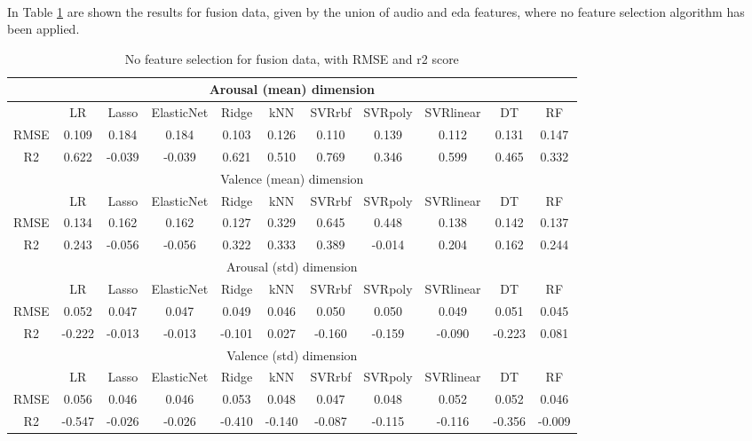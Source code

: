 \\
In Table \ref{table:fusion_no_fs} are shown the results for fusion data, given by the union of audio and \gls{eda} features, where no feature selection algorithm has been applied.
\begin{table}[h!]
\begin{adjustwidth}{-3cm}{-1cm}
	\centering
	\begin{tabular}{|c|c|c|c|c|c|c|c|c|c|c|}
		\hline \multicolumn{11}{|c|}{Arousal (mean) dimension} \\
		\hline & LR & Lasso & ElasticNet & Ridge & kNN & SVRrbf & SVRpoly & SVRlinear & DT & RF \\
		\hline RMSE & 0.109 & 0.184 & 0.184 & \cellcolor{yellow}0.103 & 0.126 & 0.110 & 0.139 & 0.112 & 0.131 & 0.147 \\
		\hline R2 & 0.622 & -0.039 & -0.039 & 0.621 & 0.510 & \cellcolor{yellow}0.769 & 0.346 & 0.599 & 0.465 & 0.332 \\
		\hline \hline  \multicolumn{11}{|c|}{Valence (mean) dimension} \\
		\hline & LR & Lasso & ElasticNet & Ridge & kNN & SVRrbf & SVRpoly & SVRlinear & DT & RF \\
		\hline RMSE & 0.134 & 0.162 & 0.162 & 0.127 & 0.329 & \cellcolor{yellow}0.645 & 0.448 & 0.138 & 0.142 & 0.137 \\
		\hline R2 & 0.243 & -0.056 & -0.056 & 0.322 & 0.333 & \cellcolor{yellow}0.389 & -0.014 & 0.204 & 0.162 & 0.244 \\
		\hline \hline  \multicolumn{11}{|c|}{Arousal (std) dimension} \\
		\hline & LR & Lasso & ElasticNet & Ridge & kNN & SVRrbf & SVRpoly & SVRlinear & DT & RF \\
		\hline RMSE & 0.052 & 0.047 & 0.047 & 0.049 & \cellcolor{yellow}0.046 & 0.050 & 0.050 & 0.049 & 0.051 & 0.045 \\
		\hline R2 & -0.222 & -0.013 & -0.013 & -0.101 & 0.027 & -0.160 & -0.159 & -0.090 & -0.223 & 0.081 \\
		\hline \hline  \multicolumn{11}{|c|}{Valence (std) dimension} \\
		\hline & LR & Lasso & ElasticNet & Ridge & kNN & SVRrbf & SVRpoly & SVRlinear & DT & RF \\
		\hline RMSE & 0.056 & \cellcolor{yellow}0.046 & \cellcolor{yellow}0.046 & 0.053 & 0.048 & 0.047 & 0.048 & 0.052 & 0.052 & 0.046 \\
		\hline R2 & -0.547 & -0.026 & -0.026 & -0.410 & -0.140 & -0.087 & -0.115 & -0.116 & -0.356 & \cellcolor{yellow}-0.009 \\
		\hline
	\end{tabular}
	\end{adjustwidth}
	\caption{No feature selection for fusion data, with RMSE and r2 score}
	\label{table:fusion_no_fs}
\end{table}
